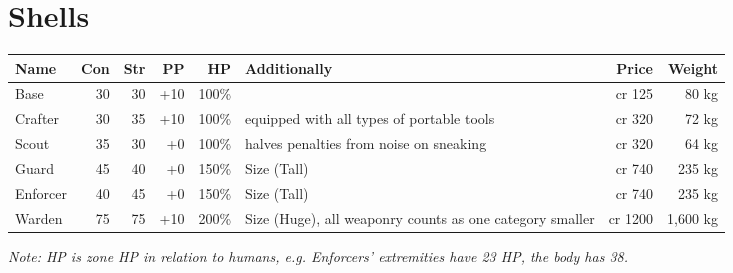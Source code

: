\documentclass[12pt,a4paper,openany,usenames,dvipsnames]{book}
\begin{document}
	\section{Shells}
	\begin{tabularx}{\textwidth}{|l|r|r|r|r|X|r|r|}
		\hline
		Name & Con & Str & PP & HP & Additionally & Price & Weight \\ \hline
		Base & 30 & 30 & +10 & 100\% & & cr 125 & 80 kg \\ \hline
		Crafter & 30 & 35 & +10 & 100\% & equipped with all types of portable tools & cr 320 & 72 kg \\ \hline
		Scout & 35 & 30 & +0 & 100\% & halves penalties from noise on sneaking & cr 320 & 64 kg \\ \hline
		Guard & 45 & 40 & +0 & 150\% & Size (Tall) & cr 740 & 235 kg \\ \hline
		Enforcer & 40 & 45 & +0 & 150\% & Size (Tall) & cr 740 & 235 kg \\ \hline
		Warden & 75 & 75 & +10 & 200\% & Size (Huge), all weaponry counts as one category smaller & cr 1200 & 1,600 kg \\ \hline
	\end{tabularx}
	\par \vspace{-8mm}
	\textit{Note: HP is zone HP in relation to humans, e.g. Enforcers' extremities have 23 HP, the body has 38.}
\end{document}
